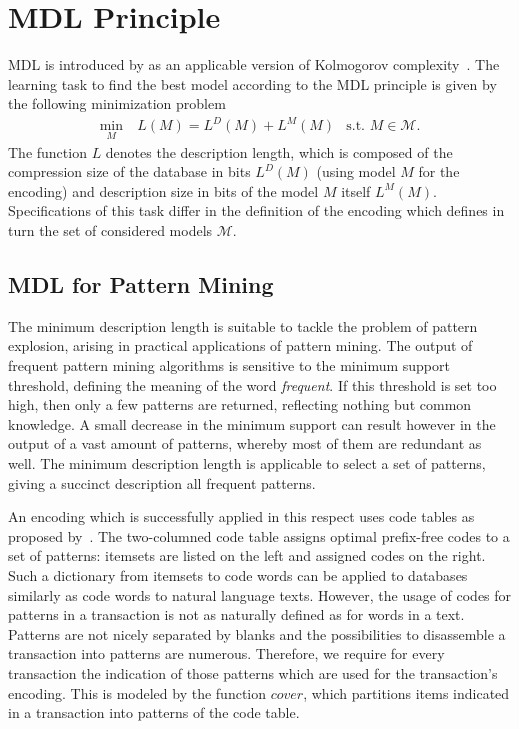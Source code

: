 \section{MDL Principle}
MDL is introduced by \cite{rissanen1978modeling} as an applicable version of Kolmogorov complexity~\citep{li2008introduction,grunwald2007minimum}.
The learning task to find the best model according to the MDL principle is given by the following minimization problem 
\begin{align*}
    	\min_M&\ L(M) = L^D(M) + L^M(M) &\text{s.t. } M\in\mathcal{M}.
\end{align*} 
The function $L$ denotes the description length, which is composed of the compression size of the database in bits $L^D(M)$ (using model $M$ for the encoding) and description size in bits of the model $M$ itself $L^M(M)$.
Specifications of this task differ in the definition of the encoding which defines in turn the set of considered models $\mathcal{M}$. 
\subsection{MDL for Pattern Mining}
The minimum description length is suitable to tackle the problem of pattern explosion, arising in practical applications of pattern mining. The output of frequent pattern mining algorithms is sensitive to the minimum support threshold, defining the meaning of the word \emph{frequent}. If this threshold is set too high, then only a few patterns are returned, reflecting nothing but common knowledge. A small decrease in the minimum support can result however in the output of a vast amount of patterns, whereby most of them are redundant as well. The minimum description length is applicable to select a set of patterns, giving a succinct description all frequent patterns.   

An encoding which is successfully applied in this respect uses code tables  as proposed by~\cite{siebes2006item}. 
The two-columned code table assigns optimal prefix-free codes to a set of patterns: itemsets are listed on the left and assigned codes on the right. Such a dictionary from itemsets to code words can be applied to databases similarly as code words to natural language texts. However, the usage of codes for patterns in a transaction is not as naturally defined as for words in a text. Patterns are not nicely separated by blanks and the possibilities to disassemble a transaction into patterns are numerous. Therefore, we require for every transaction the indication of those patterns  which are used for the transaction's encoding. This is modeled by the function $cover$, which partitions items indicated in a transaction into patterns of the code table. 

